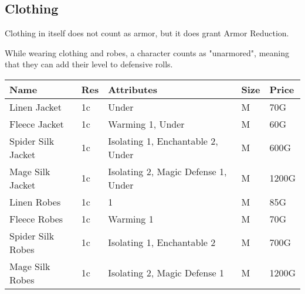 \subsection{Clothing}

Clothing in itself does not count as armor, but it does grant Armor Reduction.

While wearing clothing and robes, a character counts as "unarmored", meaning that they can add their level to defensive rolls.

\begin{longtable}{p{3cm} | p{1.5cm} | p{5cm} | p{1cm} | p{1.5cm}}
	Name & Res &   Attributes & Size & Price\\ \hline
	Linen Jacket & 1c & Under & M & 70G\\
	
	Fleece Jacket & 1c & Warming 1, Under & M & 60G\\
	
	Spider Silk Jacket & 1c & Isolating 1, Enchantable 2, Under & M & 600G\\
	
	Mage Silk Jacket & 1c & Isolating 2, Magic Defense 1, Under & M & 1200G\\
	
	Linen Robes & 1c & 1 & M & 85G\\
	
	Fleece Robes & 1c & Warming 1 & M & 70G\\

	Spider Silk Robes & 1c & Isolating 1, Enchantable 2 & M & 700G\\
	
	Mage Silk Robes & 1c & Isolating 2, Magic Defense 1 & M & 1200G\\
\end{longtable}